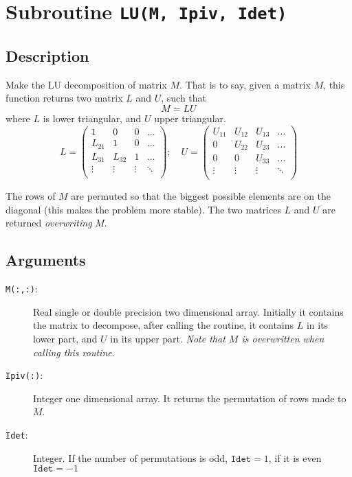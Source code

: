 \section{Subroutine \texttt{LU(M, Ipiv, Idet)}}

\subsection{Description}

Make the LU decomposition of matrix $M$. That is to say, given a
matrix $M$, this function returns two matrix $L$ and $U$, such that
\begin{equation}
  M = LU
\end{equation}
where $L$ is lower triangular, and $U$ upper triangular.
\begin{equation}
  L = \left(
    \begin{array}{cccc}
      1 & 0 & 0 &\dots \\
      L_{21} & 1 & 0 &\dots \\
      L_{31} & L_{32} & 1 &\dots \\
      \vdots & \vdots  & \vdots &\ddots \\
    \end{array}
  \right);\quad
  U = \left(
    \begin{array}{cccc}
      U_{11} & U_{12} & U_{13} &\dots \\
      0 & U_{22} & U_{23} &\dots \\
      0 & 0 & U_{33} &\dots \\
      \vdots & \vdots  & \vdots &\ddots \\
    \end{array}
  \right)
\end{equation}

The rows of $M$ are permuted so that the biggest possible elements are
on the diagonal (this makes the problem more stable). The two matrices
$L$ and $U$ are returned \emph{overwriting} $M$. 

\subsection{Arguments}

\begin{description}
\item[\texttt{M(:,:)}: ] Real single or double precision two dimensional
  array. Initially it contains the matrix to decompose, after calling
  the routine, it contains $L$ in its lower part, and $U$ in its upper
  part. \emph{Note that $M$ is overwritten when calling this routine}.
\item[\texttt{Ipiv(:)}: ] Integer one dimensional array. It returns
  the permutation of rows made to $M$.
\item[\texttt{Idet}: ] Integer. If the number of permutations is odd,
  $\mathtt{Idet}=1$, if it is even $\mathtt{Idet}=-1$
\end{description}

